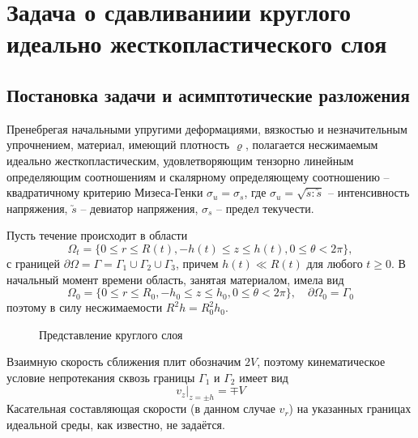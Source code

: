 \chapter{Задача о сдавливаниии круглого идеально жесткопластического слоя}\label{ch:ch1}

\section{Постановка задачи и асимптотические разложения}\label{sec:ch1/sec1}

Пренебрегая начальными упругими деформациями, вязкостью и незначительным упрочнением, материал, имеющий плотность $\varrho$, полагается несжимаемым идеально жесткопластическим, удовлетворяющим тензорно линейным определяющим соотношениям и скалярному определяющему соотношению -- квадратичному критерию Мизеса-Генки $\sigma_{u} = \sigma_{s}$, где $\sigma_{u} = \sqrt{\utilde{s} : \utilde{s}}$ -- интенсивность напряжения, $\utilde{s}$ -- девиатор напряжения, $\sigma_{s}$ -- предел текучести.

Пусть течение происходит в области
\begin{equation}
  \Omega_{t} = \{0 \le r \le R(t), -h(t) \le z \le h(t), 0 \le \theta < 2\pi\},
\end{equation}
с границей $\partial\Omega = \Gamma = \Gamma_{1} \cup \Gamma_{2} \cup \Gamma_{3}$, причем $h(t) \ll R(t)$ для любого $t \ge 0$. В начальный момент времени область, занятая материалом, имела вид
\begin{equation}
  \Omega_{0} = \{0 \le r \le R_{0}, -h_{0} \le z \le h_{0}, 0 \le \theta < 2\pi\}, \quad \partial\Omega_{0} = \Gamma_{0}
\end{equation}
поэтому в силу несжимаемости $R^{2} h=R^{2}_{0} h_{0}$.

\begin{figure}[ht]
    \caption{Представление круглого слоя}
    \label{fig:ch1/layer}
\end{figure}
Взаимную скорость сближения плит обозначим $2V$, поэтому кинематическое условие непротекания сквозь границы $\Gamma_{1}$ и $\Gamma_{2}$ имеет вид
\begin{equation}
  \label{eq:ch1/sec1/boundary/kinematic}
  v_{z}\lvert_{z=\pm h} = \mp V
\end{equation}
Касательная составляющая скорости (в данном случае $v_{r}$) на указанных границах идеальной среды, как известно, не задаётся.

